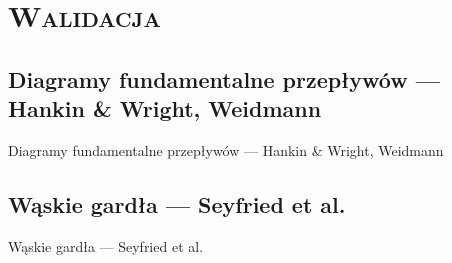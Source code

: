 \section{\scshape Walidacja}

\subsection{Diagramy fundamentalne przepływów --- Hankin \&{} Wright, Weidmann}
\begin{frame}{Diagramy fundamentalne przepływów --- Hankin \&{} Wright, Weidmann}
\end{frame}

\subsection{Wąskie gardła --- Seyfried et al.}
\begin{frame}{Wąskie gardła --- Seyfried et al.}
\end{frame}